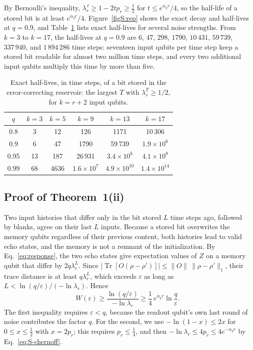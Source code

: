 \documentclass[aps,prl,twocolumn,superscriptaddress,floatfix]{revtex4-2}
\theoremstyle{plain}
\newcommand{\tr}{\operatorname{Tr}}
\newcommand{\Norm}[1]{\lVert #1\rVert}
\begin{document}
By Bernoulli's inequality, $\lambda_r^{\,t}\ge1-2tp_r\ge\frac12$ for $t\le e^{\alpha_qr}/4$, so the half-life of a stored bit is at least $e^{\alpha_qr}/4$. Figure~\ref{figS:rep} shows the exact decay and half-lives at $q=0.9$, and Table~\ref{tabS:halflife} lists exact half-lives for several noise strengths. From $k=3$ to $k=17$, the half-lives at $q=0.9$ are $6$, $47$, $298$, $1790$, $10\,431$, $59\,739$, $337\,940$, and $1\,894\,286$ time steps: seventeen input qubits per time step keep a stored bit readable for almost two million time steps, and every two additional input qubits multiply this time by more than five.

\begin{table}[t]
\caption{Exact half-lives, in time steps, of a bit stored in the error-correcting reservoir: the largest $T$ with $\lambda_r^T\ge1/2$, for $k=r+2$ input qubits.}
\label{tabS:halflife}
\begin{ruledtabular}
\begin{tabular}{cccccc}
$q$ & $k=3$ & $k=5$ & $k=9$ & $k=13$ & $k=17$ \\ \hline
0.8 & 3 & 12 & 126 & 1171 & 10\,306 \\
0.9 & 6 & 47 & 1790 & 59\,739 & $1.9\times10^{6}$ \\
0.95 & 13 & 187 & 26\,931 & $3.4\times10^{6}$ & $4.1\times10^{8}$ \\
0.99 & 68 & 4636 & $1.6\times10^{7}$ & $4.9\times10^{10}$ & $1.4\times10^{14}$ \\
\end{tabular}
\end{ruledtabular}
\end{table}

\subsection{Proof of Theorem~1(ii)}
\label{sm:lowerbound}

Two input histories that differ only in the bit stored $L$ time steps ago, followed by blanks, agree on their last $L$ inputs. Because a stored bit overwrites the memory qubits regardless of their previous content, both histories lead to valid echo states, and the memory is not a remnant of the initialization. By Eq.~\eqref{eq:response}, the two echo states give expectation values of $Z$ on a memory qubit that differ by $2q\lambda_r^L$. Since $|\tr[O(\rho-\rho')]|\le\Norm O\,\Norm{\rho-\rho'}_1$, their trace distance is at least $q\lambda_r^L$, which exceeds $\varepsilon$ as long as $L<\ln(q/\varepsilon)/(-\ln\lambda_r)$. Hence
\begin{equation}
W(\varepsilon)\ge\frac{\ln(q/\varepsilon)}{-\ln\lambda_r}\ge\frac14\,e^{\alpha_qr}\ln\frac q\varepsilon .
\label{eq:S-lower}
\end{equation}
The first inequality requires $\varepsilon<q$, because the readout qubit's own last round of noise contributes the factor $q$. For the second, we use $-\ln(1-x)\le2x$ for $0\le x\le\frac12$ with $x=2p_r$; this requires $p_r\le\frac14$, and then $-\ln\lambda_r\le4p_r\le4e^{-\alpha_qr}$ by Eq.~\eqref{eq:S-chernoff}.
\end{document}
